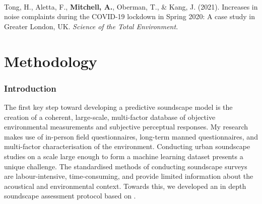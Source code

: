 \documentclass[twoside,fontsize=12pt,titlepage,chapterprefix=true
]{scrbook}
\begin{document}
\paragraph*{}Tong, H., Aletta, F., \textbf{Mitchell, A.}, Oberman, T., \& Kang, J. (2021). Increases in noise complaints during the COVID-19 lockdown in Spring 2020: A case study in Greater London, UK. \emph{Science of the Total Environment}.











\tableofcontents

\listoffigures
\listoftables


\mainmatter





\part{Methodology}
\label{part:Methodology}

\section*{Introduction}
The first key step toward developing a predictive soundscape model is the creation of a coherent, large-scale, multi-factor database of objective environmental measurements and subjective perceptual responses. My research makes use of in-person field questionnaires, long-term manned questionnaires, and multi-factor characterisation of the environment. Conducting urban soundscape studies on a scale large enough to form a machine learning dataset presents a unique challenge. The standardised methods of conducting soundscape surveys \citep{ISO12913Part2} are labour-intensive, time-consuming, and provide limited information about the acoustical and environmental context. Towards this, we developed an in depth soundscape assessment protocol based on \citet{ISO12913Part2}. 
\end{document}
